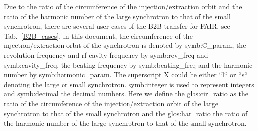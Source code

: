 Due to the ratio of the circumference of the injection/extraction orbit and the ratio of the harmonic number of the large synchrotron to that of the small synchrotron, there are several user cases of the B2B transfer for FAIR, see Tab.~\ref{B2B_cases}. In this document, the circumference of the injection/extraction orbit of the synchrotron is denoted by \gls{symb:C_param}, the revolution frequency and rf cavity frequency by \gls{symb:rev_freq} and \gls{symb:cavity_freq}, the beating frequency by \gls{symb:beating_freq} and the harmonic number by \gls{symb:harmonic_param}. The superscript X could be either ``l`` or ``s`` denoting the large or small synchrotron. \gls{symb:integer} is used to represent integers and \gls{symb:decimal} the decimal numbers. Here we define the \gls{glos:cir_ratio} as the ratio of the circumference of the injection/extraction orbit of the large synchrotron to that of the small synchrotron and the \gls{glos:har_ratio} the ratio of the harmonic number of the large synchrotron to that of the small synchrotron.

